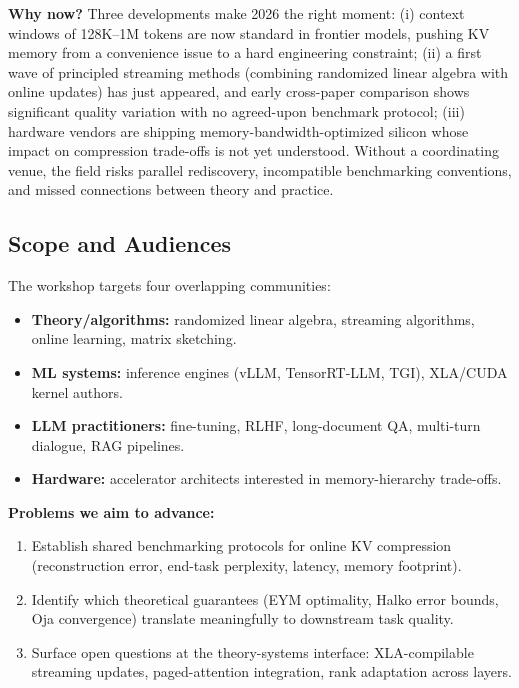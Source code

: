 \documentclass{article}
\begin{document}
\textbf{Why now?} Three developments make 2026 the right moment:
(i) context windows of 128K--1M tokens are now standard in frontier models,
pushing KV memory from a convenience issue to a hard engineering constraint;
(ii) a first wave of principled streaming methods (combining randomized linear
algebra with online updates) has just appeared, and early cross-paper comparison
shows significant quality variation with no agreed-upon benchmark protocol;
(iii) hardware vendors are shipping memory-bandwidth-optimized silicon whose
impact on compression trade-offs is not yet understood.
Without a coordinating venue, the field risks parallel rediscovery, incompatible
benchmarking conventions, and missed connections between theory and practice.

\subsection*{Scope and Audiences}

The workshop targets four overlapping communities:
\begin{itemize}[nosep,leftmargin=1.5em]
  \item \textbf{Theory/algorithms:} randomized linear algebra, streaming algorithms, online learning, matrix sketching.
  \item \textbf{ML systems:} inference engines (vLLM, TensorRT-LLM, TGI), XLA/CUDA kernel authors.
  \item \textbf{LLM practitioners:} fine-tuning, RLHF, long-document QA, multi-turn dialogue, RAG pipelines.
  \item \textbf{Hardware:} accelerator architects interested in memory-hierarchy trade-offs.
\end{itemize}

\textbf{Problems we aim to advance:}
\begin{enumerate}[nosep,leftmargin=1.5em]
  \item Establish shared benchmarking protocols for online KV compression (reconstruction error, end-task perplexity, latency, memory footprint).
  \item Identify which theoretical guarantees (EYM optimality, Halko error bounds, Oja convergence) translate meaningfully to downstream task quality.
  \item Surface open questions at the theory-systems interface: XLA-compilable streaming updates, paged-attention integration, rank adaptation across layers.
\end{enumerate}
\end{document}
